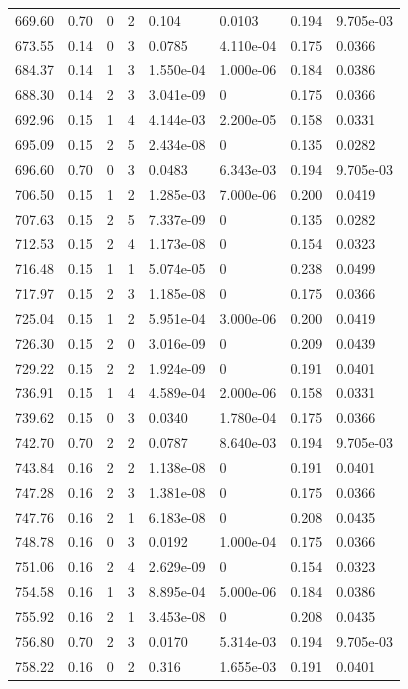 \documentclass[preview]{standalone}
\begin{document}
{{{{\begin{tabular}{L{1.2cm}C{1.2cm} C{0.3cm}C{0.5cm} C{1.4cm}C{1.4cm} C{1.4cm}C{1.4cm}}
  669.60  &  0.70  & 0     &  2 &  0.104  & 0.0103  & 0.194 &  9.705e-03   \\ 
  673.55  &  0.14  & 0     &  3 &  0.0785  & 4.110e-04  & 0.175 &  0.0366   \\ 
  684.37  &  0.14  & 1     &  3 &  1.550e-04  & 1.000e-06  & 0.184 &  0.0386   \\ 
  688.30  &  0.14  & 2     &  3 &  3.041e-09  & 0  & 0.175 &  0.0366   \\ 
  692.96  &  0.15  & 1     &  4 &  4.144e-03  & 2.200e-05  & 0.158 &  0.0331   \\ 
  695.09  &  0.15  & 2     &  5 &  2.434e-08  & 0  & 0.135 &  0.0282   \\ 
  696.60  &  0.70  & 0     &  3 &  0.0483  & 6.343e-03  & 0.194 &  9.705e-03   \\ 
  706.50  &  0.15  & 1     &  2 &  1.285e-03  & 7.000e-06  & 0.200 &  0.0419   \\ 
  707.63  &  0.15  & 2     &  5 &  7.337e-09  & 0  & 0.135 &  0.0282   \\ 
  712.53  &  0.15  & 2     &  4 &  1.173e-08  & 0  & 0.154 &  0.0323   \\ 
  716.48  &  0.15  & 1     &  1 &  5.074e-05  & 0  & 0.238 &  0.0499   \\ 
  717.97  &  0.15  & 2     &  3 &  1.185e-08  & 0  & 0.175 &  0.0366   \\ 
  725.04  &  0.15  & 1     &  2 &  5.951e-04  & 3.000e-06  & 0.200 &  0.0419   \\ 
  726.30  &  0.15  & 2     &  0 &  3.016e-09  & 0  & 0.209 &  0.0439   \\ 
  729.22  &  0.15  & 2     &  2 &  1.924e-09  & 0  & 0.191 &  0.0401   \\ 
  736.91  &  0.15  & 1     &  4 &  4.589e-04  & 2.000e-06  & 0.158 &  0.0331   \\ 
  739.62  &  0.15  & 0     &  3 &  0.0340  & 1.780e-04  & 0.175 &  0.0366   \\ 
  742.70  &  0.70  & 2     &  2 &  0.0787  & 8.640e-03  & 0.194 &  9.705e-03   \\ 
  743.84  &  0.16  & 2     &  2 &  1.138e-08  & 0  & 0.191 &  0.0401   \\ 
  747.28  &  0.16  & 2     &  3 &  1.381e-08  & 0  & 0.175 &  0.0366   \\ 
  747.76  &  0.16  & 2     &  1 &  6.183e-08  & 0  & 0.208 &  0.0435   \\ 
  748.78  &  0.16  & 0     &  3 &  0.0192  & 1.000e-04  & 0.175 &  0.0366   \\ 
  751.06  &  0.16  & 2     &  4 &  2.629e-09  & 0  & 0.154 &  0.0323   \\ 
  754.58  &  0.16  & 1     &  3 &  8.895e-04  & 5.000e-06  & 0.184 &  0.0386   \\ 
  755.92  &  0.16  & 2     &  1 &  3.453e-08  & 0  & 0.208 &  0.0435   \\ 
  756.80  &  0.70  & 2     &  3 &  0.0170  & 5.314e-03  & 0.194 &  9.705e-03   \\ 
  758.22  &  0.16  & 0     &  2 &  0.316  & 1.655e-03  & 0.191 &  0.0401   \\ 
\hline 
\end{tabular} 

}}}}
\end{document}
